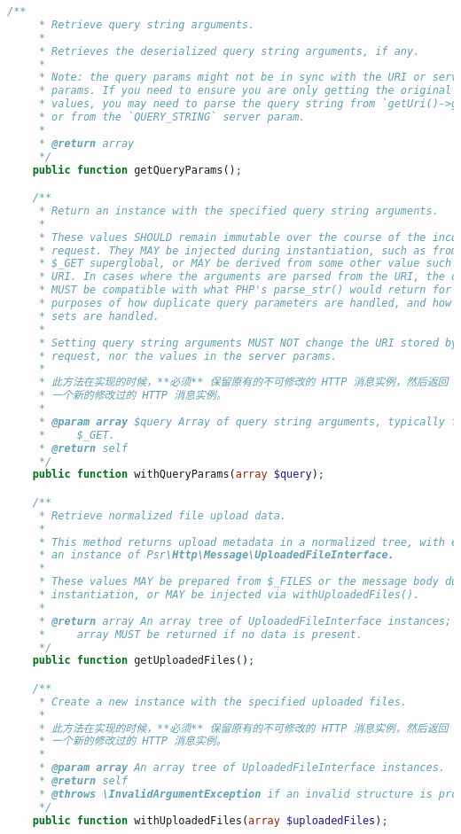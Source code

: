 \begin{lstlisting}[language=PHP]
    /**
     * Retrieve query string arguments.
     *
     * Retrieves the deserialized query string arguments, if any.
     *
     * Note: the query params might not be in sync with the URI or server
     * params. If you need to ensure you are only getting the original
     * values, you may need to parse the query string from `getUri()->getQuery()`
     * or from the `QUERY_STRING` server param.
     *
     * @return array
     */
    public function getQueryParams();

    /**
     * Return an instance with the specified query string arguments.
     *
     * These values SHOULD remain immutable over the course of the incoming
     * request. They MAY be injected during instantiation, such as from PHP's
     * $_GET superglobal, or MAY be derived from some other value such as the
     * URI. In cases where the arguments are parsed from the URI, the data
     * MUST be compatible with what PHP's parse_str() would return for
     * purposes of how duplicate query parameters are handled, and how nested
     * sets are handled.
     *
     * Setting query string arguments MUST NOT change the URI stored by the
     * request, nor the values in the server params.
     *
     * 此方法在实现的时候，**必须** 保留原有的不可修改的 HTTP 消息实例，然后返回
     * 一个新的修改过的 HTTP 消息实例。
     *
     * @param array $query Array of query string arguments, typically from
     *     $_GET.
     * @return self
     */
    public function withQueryParams(array $query);

    /**
     * Retrieve normalized file upload data.
     *
     * This method returns upload metadata in a normalized tree, with each leaf
     * an instance of Psr\Http\Message\UploadedFileInterface.
     *
     * These values MAY be prepared from $_FILES or the message body during
     * instantiation, or MAY be injected via withUploadedFiles().
     *
     * @return array An array tree of UploadedFileInterface instances; an empty
     *     array MUST be returned if no data is present.
     */
    public function getUploadedFiles();

    /**
     * Create a new instance with the specified uploaded files.
     *
     * 此方法在实现的时候，**必须** 保留原有的不可修改的 HTTP 消息实例，然后返回
     * 一个新的修改过的 HTTP 消息实例。
     *
     * @param array An array tree of UploadedFileInterface instances.
     * @return self
     * @throws \InvalidArgumentException if an invalid structure is provided.
     */
    public function withUploadedFiles(array $uploadedFiles);


\end{lstlisting}
